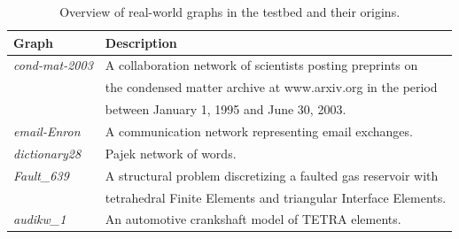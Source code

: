 \begin{table}[t]
\centering
\caption{Overview of real-world graphs in the testbed and their origins.}
\label{tab:real-graphs}
\begin{tabular}{ll}
{\bf Graph} & {\bf Description} \\ \hline \hline
{\it cond-mat-2003} \cite{Newman06042004} & A collaboration network of scientists posting preprints 
on \\ & the condensed matter archive at www.arxiv.org in the period \\ 
& between January 1, 1995 and June 30, 2003. \\ \hline
{\it email-Enron} \cite{Leskovec:2005:GOT:1081870.1081893} & A communication network representing
email exchanges. \\
\hline %
{\it dictionary28} \cite{pajek2006} & Pajek network of words. \\ \hline
{\it Fault\_639} \cite{Ferronato20083922} & A structural problem discretizing a faulted gas reservoir with \\
& tetrahedral Finite Elements and triangular Interface Elements. \\ \hline
{\it audikw\_1} \cite{Davis97theuniversity} & An automotive crankshaft model of TETRA elements. \\ \hline

\end{tabular}
\end{table}
